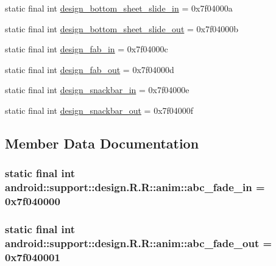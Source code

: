 \begin{CompactItemize}
\item 
static final int \hyperlink{classandroid_1_1support_1_1design_1_1_r_1_1anim_963d502e777068cc7fd83e4a61e4f4e5}{design\_\-bottom\_\-sheet\_\-slide\_\-in} = 0x7f04000a
\item 
static final int \hyperlink{classandroid_1_1support_1_1design_1_1_r_1_1anim_14e891bd1f6408a71faf90750905742f}{design\_\-bottom\_\-sheet\_\-slide\_\-out} = 0x7f04000b
\item 
static final int \hyperlink{classandroid_1_1support_1_1design_1_1_r_1_1anim_0b64e4d0b9ae46ca7e55cfecbfb946f7}{design\_\-fab\_\-in} = 0x7f04000c
\item 
static final int \hyperlink{classandroid_1_1support_1_1design_1_1_r_1_1anim_e2cfeff71b0f26864d1822d93a8139df}{design\_\-fab\_\-out} = 0x7f04000d
\item 
static final int \hyperlink{classandroid_1_1support_1_1design_1_1_r_1_1anim_925f09683feb54ce1a26bf0e7c37d8da}{design\_\-snackbar\_\-in} = 0x7f04000e
\item 
static final int \hyperlink{classandroid_1_1support_1_1design_1_1_r_1_1anim_07b70470210eb4b3c2fdf37ad49f70f9}{design\_\-snackbar\_\-out} = 0x7f04000f
\end{CompactItemize}


\subsection{Member Data Documentation}
\hypertarget{classandroid_1_1support_1_1design_1_1_r_1_1anim_216b006e30d9dbec439ac3abc9cfbf82}{
\subsubsection[{abc\_\-fade\_\-in}]{\setlength{\rightskip}{0pt plus 5cm}static final int android::support::design.R.R::anim::abc\_\-fade\_\-in = 0x7f040000}}
\label{classandroid_1_1support_1_1design_1_1_r_1_1anim_216b006e30d9dbec439ac3abc9cfbf82}


\hypertarget{classandroid_1_1support_1_1design_1_1_r_1_1anim_a138bc0535bcb87536876e85572f07db}{
\subsubsection[{abc\_\-fade\_\-out}]{\setlength{\rightskip}{0pt plus 5cm}static final int android::support::design.R.R::anim::abc\_\-fade\_\-out = 0x7f040001}}
\label{classandroid_1_1support_1_1design_1_1_r_1_1anim_a138bc0535bcb87536876e85572f07db}


